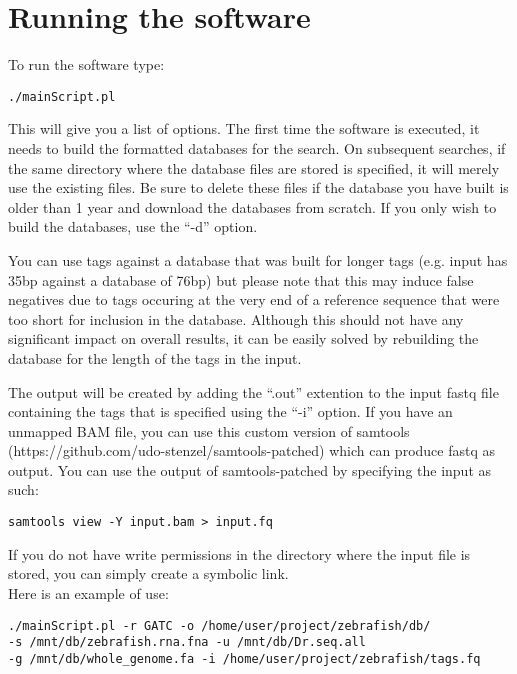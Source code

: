 \documentclass[a4paper,12pt]{article}
\begin{document}
\section{Running the software}

To run the software type:
\small{
\begin{verbatim}
./mainScript.pl
\end{verbatim}
}

This will give you a list of options. The first time the software is executed, it needs to build the formatted databases for the search. On subsequent searches, if the same directory where the database files are stored is specified, it will merely use the existing files. Be sure to delete these files if the database you have built is older than 1 year and download the databases from scratch. If you only wish to build the databases, use the ``-d'' option. 

You can use tags against a database that was built for longer tags (e.g. input has 35bp against a database of 76bp) but please note that this may induce false negatives due to tags occuring at the very end of a reference sequence that were too short for inclusion in the database. Although this should not have any significant impact on overall results, it can be easily solved by rebuilding the database for the length of the tags in the input.

The output will be created by adding the ``.out'' extention to the input fastq file containing the tags that is specified using the ``-i'' option. If you have an unmapped BAM file, you can use this custom version of samtools (https://github.com/udo-stenzel/samtools-patched) which can produce fastq as output. You can use the output of samtools-patched by specifying the input as such:
\small{
\begin{verbatim}
samtools view -Y input.bam > input.fq
\end{verbatim}
}

If you do not have write permissions in the directory where the input file is stored, you can simply create a symbolic link. \\

Here is an example of use:

\small{
\begin{verbatim}
./mainScript.pl -r GATC -o /home/user/project/zebrafish/db/ 
-s /mnt/db/zebrafish.rna.fna -u /mnt/db/Dr.seq.all 
-g /mnt/db/whole_genome.fa -i /home/user/project/zebrafish/tags.fq
\end{verbatim}
}
\end{document}
